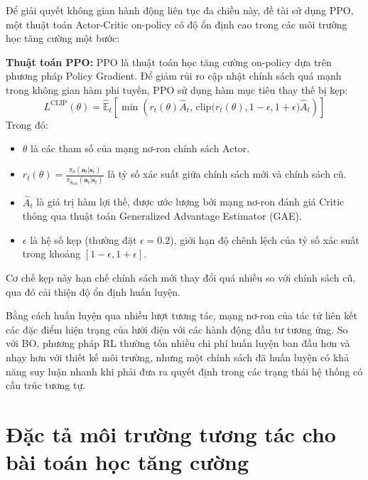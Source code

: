 Để giải quyết không gian hành động liên tục đa chiều này, đề tài sử dụng PPO, một thuật toán Actor-Critic on-policy có độ ổn định cao trong các môi trường học tăng cường một bước:

\textbf{Thuật toán PPO:}
PPO \cite{schulman2017ppo} là thuật toán học tăng cường on-policy dựa trên phương pháp Policy Gradient. Để giảm rủi ro cập nhật chính sách quá mạnh trong không gian hàm phi tuyến, PPO sử dụng hàm mục tiêu thay thế bị kẹp:
\begin{equation}
    L^{\text{CLIP}}(\theta) = \hat{\mathbb{E}}_t \left[ \min\left( r_t(\theta) \hat{A}_t, \, \text{clip}\big(r_t(\theta), 1-\epsilon, 1+\epsilon\big) \hat{A}_t \right) \right]
    \label{eq:ppo_objective}
\end{equation}
Trong đó:
\begin{itemize}
    \item $\theta$ là các tham số của mạng nơ-ron chính sách Actor.
    \item $r_t(\theta) = \frac{\pi_\theta(\mathbf{a}_t|\mathbf{s}_t)}{\pi_{\theta_{\text{old}}}(\mathbf{a}_t|\mathbf{s}_t)}$ là tỷ số xác suất giữa chính sách mới và chính sách cũ.
    \item $\hat{A}_t$ là giá trị hàm lợi thế, được ước lượng bởi mạng nơ-ron đánh giá Critic thông qua thuật toán Generalized Advantage Estimator (GAE).
    \item $\epsilon$ là hệ số kẹp (thường đặt $\epsilon = 0.2$), giới hạn độ chênh lệch của tỷ số xác suất trong khoảng $[1-\epsilon, 1+\epsilon]$.
\end{itemize}
Cơ chế kẹp này hạn chế chính sách mới thay đổi quá nhiều so với chính sách cũ, qua đó cải thiện độ ổn định huấn luyện.

Bằng cách huấn luyện qua nhiều lượt tương tác, mạng nơ-ron của tác tử liên kết các đặc điểm hiện trạng của lưới điện với các hành động đầu tư tương ứng. So với BO, phương pháp RL thường tốn nhiều chi phí huấn luyện ban đầu hơn và nhạy hơn với thiết kế môi trường, nhưng một chính sách đã huấn luyện có khả năng suy luận nhanh khi phải đưa ra quyết định trong các trạng thái hệ thống có cấu trúc tương tự.

\section{Đặc tả môi trường tương tác cho bài toán học tăng cường}

